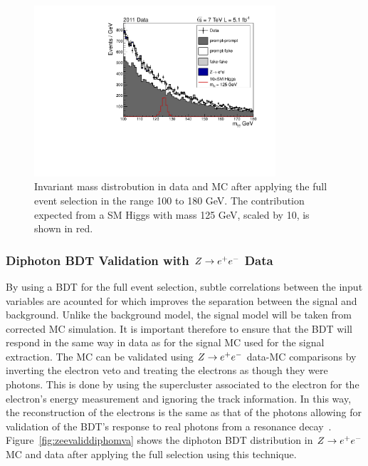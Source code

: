 \begin{figure}[hbt!]
\begin{center}
  \includegraphics[width=0.8\textwidth]{hgg7TeV/variablePlots/mass}
 \caption{Invariant mass distrobution in data and MC after applying the full event selection in the
 range 100 to 180 GeV. The contribution expected from a SM Higgs with mass 125 GeV, scaled by 10, 
 is shown in red. }
 \label{fig:massmcdata}
\end{center}
\end{figure}

\subsubsection{Diphoton BDT Validation with $Z\rightarrow e^{+}e^{-}$ Data}
By using a BDT for the full event selection, subtle correlations between the input variables are acounted for
which improves the separation between the signal and background. 
Unlike the background model, the signal model will be taken from corrected MC simulation. 
It is important therefore to ensure that the BDT will respond in the same way in data as for the signal MC
used for the signal extraction. The MC can be validated using $Z\rightarrow e^{+}e^{-}$ data-MC
comparisons by inverting the electron veto and treating the electrons as though they were photons.
This is done by using the supercluster associated to the electron for the electron's energy measurement 
and ignoring the track information. In this way, the reconstruction of the electrons is the same as that
of the photons allowing for validation of the BDT's response to real photons from a resonance decay~\cite{null}. 
Figure~\ref{fig:zeevaliddiphomva} shows the diphoton BDT distribution in $Z\rightarrow e^{+}e^{-}$ MC and data after applying
the full selection using this technique. 

